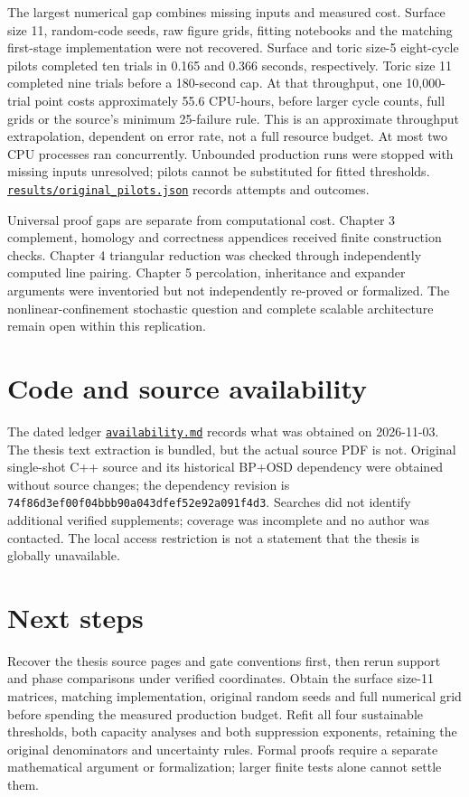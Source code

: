 \documentclass[11pt]{article}
\begin{document}
The largest numerical gap combines missing inputs and measured cost. Surface size 11, random-code seeds, raw figure grids, fitting notebooks and the matching first-stage implementation were not recovered. Surface and toric size-5 eight-cycle pilots completed ten trials in 0.165 and 0.366 seconds, respectively. Toric size 11 completed nine trials before a 180-second cap. At that throughput, one 10,000-trial point costs approximately 55.6 CPU-hours, before larger cycle counts, full grids or the source's minimum 25-failure rule. This is an approximate throughput extrapolation, dependent on error rate, not a full resource budget. At most two CPU processes ran concurrently. Unbounded production runs were stopped with missing inputs unresolved; pilots cannot be substituted for fitted thresholds. \href{https://github.com/alectionary/vibe-math/blob/master/formalization/quintavalle-hgp/results/original_pilots.json}{\nolinkurl{results/original_pilots.json}} records attempts and outcomes.

Universal proof gaps are separate from computational cost. Chapter 3 complement, homology and correctness appendices received finite construction checks. Chapter 4 triangular reduction was checked through independently computed line pairing. Chapter 5 percolation, inheritance and expander arguments were inventoried but not independently re-proved or formalized. The nonlinear-confinement stochastic question and complete scalable architecture remain open within this replication.

\section{Code and source availability}
The dated ledger \href{https://github.com/alectionary/vibe-math/blob/master/formalization/quintavalle-hgp/availability.md}{\nolinkurl{availability.md}} records what was obtained on 2026-11-03. The thesis text extraction is bundled, but the actual source PDF is not. Original single-shot C++ source and its historical BP+OSD dependency were obtained without source changes; the dependency revision is \texttt{74f86d3ef00f04bbb90a043dfef52e92a091f4d3}. Searches did not identify additional verified supplements; coverage was incomplete and no author was contacted. The local access restriction is not a statement that the thesis is globally unavailable.

\section{Next steps}
Recover the thesis source pages and gate conventions first, then rerun support and phase comparisons under verified coordinates. Obtain the surface size-11 matrices, matching implementation, original random seeds and full numerical grid before spending the measured production budget. Refit all four sustainable thresholds, both capacity analyses and both suppression exponents, retaining the original denominators and uncertainty rules. Formal proofs require a separate mathematical argument or formalization; larger finite tests alone cannot settle them.
\end{document}
